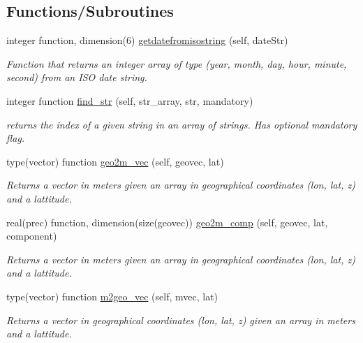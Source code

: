 \subsection*{Functions/\+Subroutines}
\begin{DoxyCompactItemize}
\item 
integer function, dimension(6) \mbox{\hyperlink{namespaceutilities__mod_ab5b97f243f9347a40db76d55509d37ca}{getdatefromisostring}} (self, date\+Str)
\begin{DoxyCompactList}\small\item\em Function that returns an integer array of type (year, month, day, hour, minute, second) from an I\+SO date string. \end{DoxyCompactList}\item 
integer function \mbox{\hyperlink{namespaceutilities__mod_ad446cce78a6509db0e839439a0e84564}{find\+\_\+str}} (self, str\+\_\+array, str, mandatory)
\begin{DoxyCompactList}\small\item\em returns the index of a given string in an array of strings. Has optional mandatory flag. \end{DoxyCompactList}\item 
type(vector) function \mbox{\hyperlink{namespaceutilities__mod_a3d3d0e1568b178cd3e0bb8013642946c}{geo2m\+\_\+vec}} (self, geovec, lat)
\begin{DoxyCompactList}\small\item\em Returns a vector in meters given an array in geographical coordinates (lon, lat, z) and a lattitude. \end{DoxyCompactList}\item 
real(prec) function, dimension(size(geovec)) \mbox{\hyperlink{namespaceutilities__mod_aff2244d9152396064656f20f4936a18c}{geo2m\+\_\+comp}} (self, geovec, lat, component)
\begin{DoxyCompactList}\small\item\em Returns a vector in meters given an array in geographical coordinates (lon, lat, z) and a lattitude. \end{DoxyCompactList}\item 
type(vector) function \mbox{\hyperlink{namespaceutilities__mod_a70b21b18c8633b7fd4c3057530d3f16f}{m2geo\+\_\+vec}} (self, mvec, lat)
\begin{DoxyCompactList}\small\item\em Returns a vector in geographical coordinates (lon, lat, z) given an array in meters and a lattitude. \end{DoxyCompactList}\item 

\end{DoxyCompactItemize}
